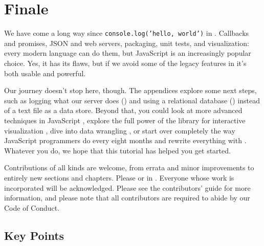 \chapter{Finale}\label{s:finale}

We have come a long way since \texttt{console.log('hello,\ world')} in .
Callbacks and promises,
JSON and web servers,
packaging, unit tests, and visualization:
every modern language can do them,
but JavaScript is an increasingly popular choice.
Yes,
it has its flaws,
but if we avoid some of the legacy features in 
it's both usable and powerful.

Our journey doesn't stop here, though.
The appendices explore some next steps,
such as logging what our server does ()
and using a relational database () instead of a text file
as a data store.
Beyond that,
you could look at more advanced techniques in JavaScript \cite{Have2018},
explore the full power of the  library for interactive visualization \cite{Meek2017},
dive into data wrangling \cite{Davi2018},
or start over completely the way JavaScript programmers do every eight months
and rewrite everything with .
Whatever you do,
we hope that this tutorial has helped you get started.

Contributions of all kinds are welcome,
from errata and minor improvements to entirely new sections and chapters.
Please 
or 
in .
Everyone whose work is incorporated will be acknowledged.
Please see the contributors' guide for more information,
and please note that all contributors are required to abide by
our Code of Conduct.

\section*{Key Points}


